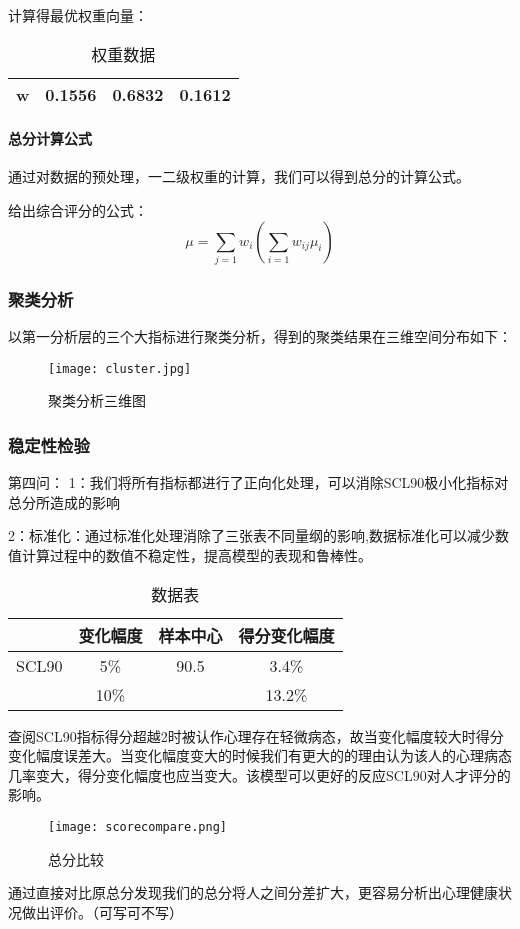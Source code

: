 \documentclass[withoutpreface,bwprint]{cumcmthesis} %
\begin{document}
计算得最优权重向量：

\begin{table}[h]
    \centering
    \begin{tabular}{cccc}
        \toprule
        w & 0.1556 & 0.6832 & 0.1612 \\ \bottomrule
    \end{tabular}
    \caption{权重数据}
    \label{tab:weights}
\end{table}

\paragraph*{总分计算公式} 通过对数据的预处理，一二级权重的计算，我们可以得到总分的计算公式。


给出综合评分的公式：
\begin{equation}
    \mu = \sum_{j=1} w_i (\sum_{i=1} w_{ij}\mu_i)
\end{equation}


\subsubsection{聚类分析}

以第一分析层的三个大指标进行聚类分析，得到的聚类结果在三维空间分布如下：


\begin{figure}[!h]
    \centering
    \texttt{[image: cluster.jpg]}
    \caption{聚类分析三维图}
    \label{fig:cluster}
\end{figure}


\subsubsection{稳定性检验}


第四问：
1：我们将所有指标都进行了正向化处理，可以消除SCL90极小化指标对总分所造成的影响

2：标准化：通过标准化处理消除了三张表不同量纲的影响,数据标准化可以减少数值计算过程中的数值不稳定性，提高模型的表现和鲁棒性。

\begin{table}[h]
    \centering
    \begin{tabular}{cccc}
        \toprule
        & 变化幅度 & 样本中心 & 得分变化幅度 \\ \midrule
        SCL90 & 5\% & 90.5 & 3.4\% \\ 
              & 10\% & & 13.2\% \\ 
        \bottomrule
    \end{tabular}
    \caption{数据表}
    \label{tab:data}
\end{table}
查阅SCL90指标得分超越2时被认作心理存在轻微病态，故当变化幅度较大时得分变化幅度误差大。当变化幅度变大的时候我们有更大的的理由认为该人的心理病态几率变大，得分变化幅度也应当变大。该模型可以更好的反应SCL90对人才评分的影响。
\begin{figure}[!h]
    \centering
    \texttt{[image: scorecompare.png]}
    \caption{总分比较}
    \label{fig:scorecompare}
\end{figure}
通过直接对比原总分发现我们的总分将人之间分差扩大，更容易分析出心理健康状况做出评价。（可写可不写）
\end{document}
